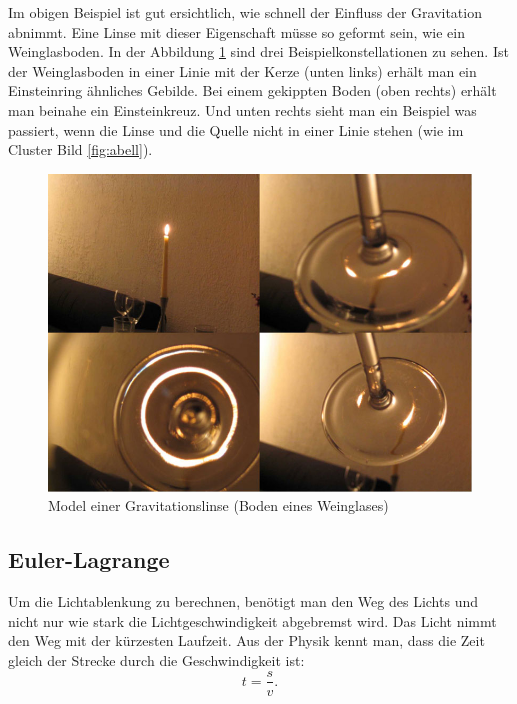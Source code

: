 \begin{refsection}
Im obigen Beispiel ist gut ersichtlich, wie schnell der Einfluss der
Gravitation abnimmt.  Eine Linse mit dieser Eigenschaft müsse so
geformt sein, wie ein Weinglasboden.  In der Abbildung
\ref{fig:ModelGravLinse} sind drei Beispielkonstellationen zu sehen.
Ist der Weinglasboden in einer Linie mit der Kerze (unten links)
erhält man ein Einsteinring ähnliches Gebilde.  Bei einem gekippten
Boden (oben rechts) erhält man beinahe ein Einsteinkreuz.  Und unten
rechts sieht man ein Beispiel was passiert, wenn die Linse und die
Quelle nicht in einer Linie stehen (wie im Cluster Bild
\ref{fig:abell}).

\begin{figure}
  \centering
  \includegraphics[width=\textwidth]{cluster/images/model_grav_lens}
  \caption{Model einer Gravitationslinse (Boden eines Weinglases)
    \cite{standford:ModelGravLens}}
  \label{fig:ModelGravLinse}
\end{figure}

\subsection{Euler-Lagrange}
Um die Lichtablenkung zu berechnen, benötigt man den Weg des Lichts
und nicht nur wie stark die Lichtgeschwindigkeit abgebremst wird.  Das
Licht nimmt den Weg mit der kürzesten Laufzeit.  Aus der Physik kennt
man, dass die Zeit gleich der Strecke durch die Geschwindigkeit ist:
\begin{equation*}
  t = \frac{s}{v}.
\end{equation*}


\end{refsection}
